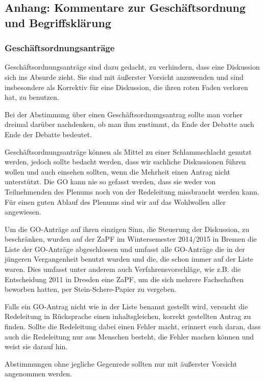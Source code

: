 \subsection*{Anhang: Kommentare zur Geschäftsordnung und Begriffsklärung%
  \label{anhang-kommentare-zur-geschaftsordnung-und-begriffsklarung}%
}


\subsubsection*{Geschäftsordnungsanträge%
  \label{id1}%
}

Geschäftsordnungsanträge sind dazu gedacht, zu verhindern, dass eine Diskussion
sich ins Absurde zieht. Sie sind mit äußerster Vorsicht anzuwenden und sind
insbesondere als Korrektiv für eine Diskussion, die ihren roten Faden verloren
hat, zu benutzen.

Bei der Abstimmung über einen Geschäftsordnungsantrag sollte man vorher dreimal
darüber nachdenken, ob man ihm zustimmt, da Ende der Debatte auch Ende der Debatte
bedeutet.

Geschäftsordnungsanträge können als Mittel zu einer Schlammschlacht genutzt
werden, jedoch sollte bedacht werden, dass wir sachliche Diskussionen führen
wollen und auch einsehen sollten, wenn die Mehrheit einen Antrag nicht
unterstützt. Die GO kann nie so gefasst werden, dass sie weder von Teilnehmenden
des Plenums noch von der Redeleitung missbraucht werden kann. Für einen guten
Ablauf des Plenums sind wir auf das Wohlwollen aller angewiesen.

Um die GO-Anträge auf ihren einzigen Sinn, die Steuerung der Diskussion, zu
beschränken, wurden auf der ZaPF im Wintersemester 2014/2015 in Bremen die Liste
der GO-Anträge abgeschlossen und umfasst alle GO-Anträge die in der jüngeren
Vergangenheit benutzt wurden und die, die schon immer auf der Liste waren.
Dies umfasst unter anderem auch Verfahrensvorschläge,
wie z.B. die Entscheidung 2011 in Dresden eine ZaPF, um die sich mehrere
Fachschaften beworben hatten, per Stein-Schere-Papier zu vergeben.

Falls ein GO-Antrag nicht wie in der Liste benannt gestellt wird, versucht die
Redeleitung in Rücksprache einen inhaltsgleichen, korrekt gestellten Antrag zu
finden. Sollte die Redeleitung dabei einen Fehler macht, erinnert euch daran,
dass auch die Redeleitung nur aus Menschen besteht, die Fehler machen können und
weist sie darauf hin.

Abstimmungen ohne jegliche Gegenrede sollten nur mit äußerster Vorsicht
angenommen werden.


